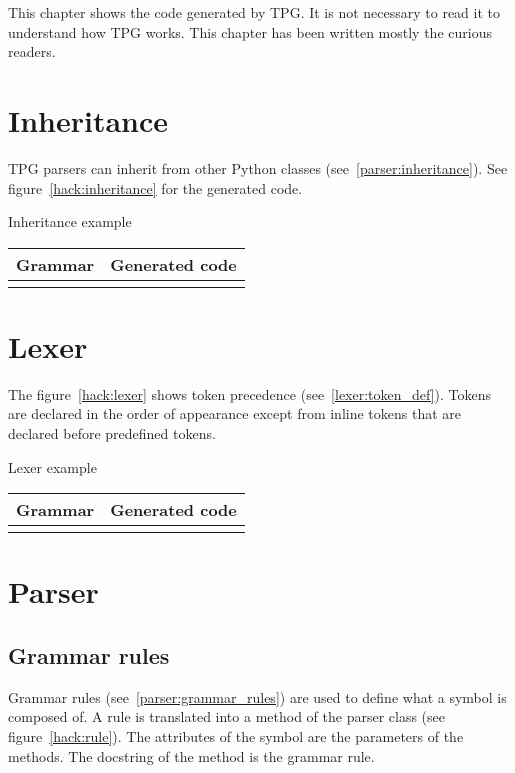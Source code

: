 
\newcommand{\hack}[3]
{
	\begin{tableau}
	\caption{#2}											\label{#3}
	\begin{tabular}{| p{6cm} | p{8cm} | }
	\hline
		Grammar & Generated code \\
	\hline
	\hline
		{ \scriptsize \verbatimtabinput[4]{hack/#1.g} }
		&
		{ \scriptsize \verbatimtabinput[4]{hack/#1.py} }
		\\
	\hline
	\end{tabular}
	\end{tableau}
}

This chapter shows the code generated by TPG.
It is not necessary to read it to understand how TPG works.
This chapter has been written mostly the curious readers.

\section{Inheritance}

TPG parsers can inherit from other Python classes (see~\ref{parser:inheritance}).
See figure~\ref{hack:inheritance} for the generated code.

\hack{baseclasses}{Inheritance example}{hack:inheritance}

\clearpage
\section{Lexer}

The figure~\ref{hack:lexer} shows token precedence (see~\ref{lexer:token_def}).
Tokens are declared in the order of appearance except from inline tokens that are declared before predefined tokens.

\hack{lexer}{Lexer example}{hack:lexer}

\clearpage
\section{Parser}

\subsection{Grammar rules}

Grammar rules (see~\ref{parser:grammar_rules}) are used to define what a symbol is composed of.
A rule is translated into a method of the parser class (see figure~\ref{hack:rule}).
The attributes of the symbol are the parameters of the methods.
The docstring of the method is the grammar rule.

